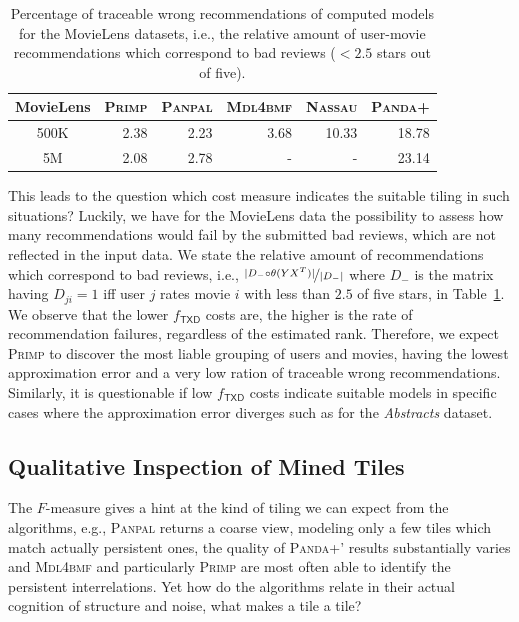 \begin{table}%
	\centering
	\begin{tabular}{crrrrr}\toprule
    MovieLens & \textsc{Primp} & \textsc{Panpal} & \textsc{Mdl4bmf} & \textsc{Nassau} & \textsc{Panda+}\\ 
    \midrule
    500K & 2.38 & 2.23 &3.68 & 10.33 & 18.78\\
    5M   & 2.08 & 2.78 &-&-&23.14\\
    \bottomrule
    \end{tabular}
    \caption{Percentage of traceable wrong recommendations of computed models for the MovieLens datasets, i.e., the relative amount of user-movie recommendations which correspond to bad reviews ($<2.5$ stars out of five).}
    \label{tbl:FP}
\end{table}

This leads to the question which cost measure indicates the suitable tiling in such situations? Luckily, we have for the MovieLens data the possibility to assess how many recommendations would fail by the submitted bad reviews, which are not reflected in the input data. We state the relative amount of recommendations which correspond to bad reviews, i.e., $\nicefrac{|D_-\circ \theta(YX^T)|}{|D_-|}$ where $D_-$ is the matrix having $D_{ji}=1$ iff user $j$ rates movie $i$ with less than $2.5$ of five stars, in Table~\ref{tbl:FP}. We observe that the lower $f_\mathsf{TXD}$ costs are, the higher is the rate of recommendation failures, regardless of the estimated rank.  Therefore, we expect \textsc{Primp} to discover the most liable grouping of users and movies, having the lowest approximation error and a very low ration of traceable wrong recommendations. Similarly, it is questionable if low $f_\mathsf{TXD}$ costs indicate suitable models in specific cases where the approximation error diverges such as for the \textit{Abstracts} dataset.
\subsection{Qualitative Inspection of Mined Tiles} 
The $F$-measure gives a hint at the kind of tiling we can expect from the algorithms, e.g., \textsc{Panpal} returns a coarse view, modeling only a few tiles which match actually persistent ones, the quality of \textsc{Panda+}' results substantially varies and \textsc{Mdl4bmf} and particularly \textsc{Primp} are most often able to identify the persistent interrelations. Yet how do the algorithms relate in their actual cognition of structure and noise, what makes a tile a tile?

